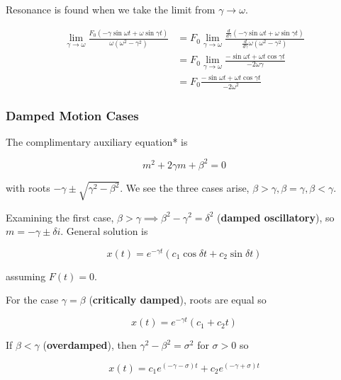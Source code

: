 Resonance is found when we take the limit from $\gamma\to \omega$.

\begin{align*}
    \lim_{\gamma\to \omega}\frac{F_0(-\gamma \sin\omega t+\omega \sin\gamma t)}{\omega(\omega^2-\gamma^2)}&=F_0\lim_{\gamma\to\omega}\frac{\frac{d}{d\gamma}(-\gamma \sin\omega t+\omega \sin\gamma t)}{\frac{d}{d\gamma}\omega(\omega^2-\gamma^2)}\\
    &=F_0\lim_{\gamma\to \omega}\frac{-\sin\omega t+\omega t\cos \gamma t}{-2\omega\gamma}\\
    &=F_0\frac{-\sin\omega t+\omega t\cos\gamma t}{-2\omega^2}
\end{align*}

\subsubsection{Damped Motion Cases}

The complimentary auxiliary equation* is

\begin{equation*}
    m^2+2\gamma m+\beta^2=0
\end{equation*}

with roots $-\gamma \pm \sqrt{\gamma^2-\beta^2}$. We see the three cases arise,
$\beta > \gamma , \beta=\gamma,\beta <\gamma$.

Examining the first case, $\beta>\gamma\implies \beta^2-\gamma^2=\delta^2$ (\textbf{damped oscillatory}), so
$m=-\gamma \pm \delta i$. General solution is

\begin{equation*}
    x(t)=e^{-\gamma t}(c_1\cos\delta t+c_2\sin\delta t)
\end{equation*}

assuming $F(t)=0$.

For the case $\gamma = \beta$ (\textbf{critically damped}), roots are equal so

\begin{equation*}
    x(t)=e^{-\gamma t}(c_1+c_2t)
\end{equation*}

If $\beta<\gamma$ (\textbf{overdamped}), then $\gamma^2-\beta^2=\sigma^2$ for $\sigma>0$ so

\begin{equation*}
    x(t)=c_1e^{(-\gamma-\sigma)t}+c_2e^{(-\gamma+\sigma)t}
\end{equation*}

